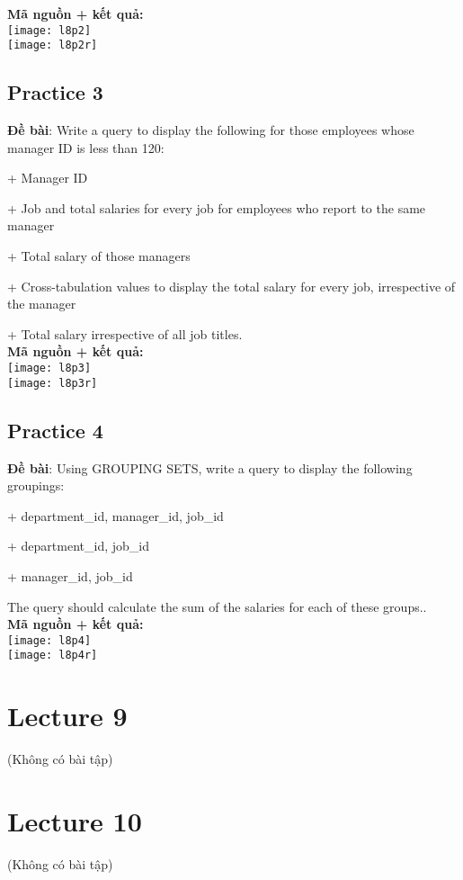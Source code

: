 \documentclass[a4paper]{report}
\begin{document}
\textbf{Mã nguồn + kết quả: }\\
\texttt{[image: l8p2]}\\
\texttt{[image: l8p2r]}

\subsection{Practice 3}
\noindent
\textbf{Đề bài}: Write a query to display the following for those employees whose manager ID is less than 120:\par
+ Manager ID\par
+ Job and total salaries for every job for employees who report to the same manager\par
+ Total salary of those managers\par
+ Cross-tabulation values to display the total salary for every job, irrespective of the manager\par
+ Total salary irrespective of all job titles.\\

\textbf{Mã nguồn + kết quả: }\\
\texttt{[image: l8p3]}\\
\texttt{[image: l8p3r]}

\subsection{Practice 4}
\noindent
\textbf{Đề bài}: Using GROUPING SETS, write a query to display the following groupings:\par
+ department\_id, manager\_id, job\_id\par
+ department\_id, job\_id\par
+ manager\_id, job\_id\par
The query should calculate the sum of the salaries for each of these groups..\\

\textbf{Mã nguồn + kết quả: }\\
\texttt{[image: l8p4]}\\
\texttt{[image: l8p4r]}

\section{Lecture 9}\par(Không có bài tập)
\section{Lecture 10}\par(Không có bài tập)
\end{document}
